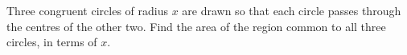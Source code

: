 Three congruent circles of radius $x$ are drawn so that each circle passes through the centres of the other two. Find the area of the region common to all three circles, in terms of $x$.
